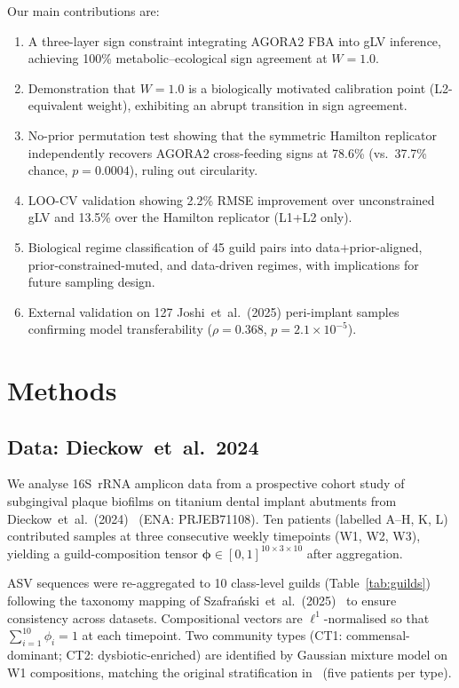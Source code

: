\documentclass[11pt,a4paper]{article}
\newcommand{\bphi}{\boldsymbol{\phi}}
\begin{document}
Our main contributions are:
\begin{enumerate}[noitemsep]
  \item A three-layer sign constraint integrating AGORA2 FBA into gLV inference,
        achieving 100\% metabolic--ecological sign agreement at $W{=}1.0$.
  \item Demonstration that $W{=}1.0$ is a biologically motivated calibration
        point (L2-equivalent weight), exhibiting an abrupt transition in sign
        agreement.
  \item No-prior permutation test showing that the symmetric Hamilton replicator
        independently recovers AGORA2 cross-feeding signs at 78.6\%
        (vs.\ 37.7\% chance, $p{=}0.0004$), ruling out circularity.
  \item LOO-CV validation showing 2.2\% RMSE improvement over unconstrained
        gLV and 13.5\% over the Hamilton replicator (L1+L2 only).
  \item Biological regime classification of 45 guild pairs into
        data$+$prior-aligned, prior-constrained-muted, and data-driven
        regimes, with implications for future sampling design.
  \item External validation on 127 Joshi~et~al.\ (2025) peri-implant samples
        confirming model transferability ($\rho{=}0.368$, $p{=}2.1{\times}10^{-5}$).
\end{enumerate}

\section{Methods}
\label{sec:methods}

\subsection{Data: Dieckow~et~al.\ 2024}
\label{ssec:data}

We analyse 16S~rRNA amplicon data from a prospective cohort study of
subgingival plaque biofilms on titanium dental implant abutments from
Dieckow~et~al.\ (2024)~\citep{dieckow2024} (ENA: PRJEB71108).
Ten patients (labelled A--H, K, L) contributed samples at three consecutive
weekly timepoints (W1, W2, W3), yielding a guild-composition tensor
$\bphi \in [0,1]^{10 \times 3 \times 10}$ after aggregation.

ASV sequences were re-aggregated to 10 class-level guilds (Table~\ref{tab:guilds})
following the taxonomy mapping of Szafra\'{n}ski~et~al.~(2025)~\citep{szafranski2025}
to ensure consistency across datasets.
Compositional vectors are $\ell^1$-normalised so that $\sum_{i=1}^{10}\phi_i=1$
at each timepoint.
Two community types (CT1: commensal-dominant; CT2: dysbiotic-enriched) are
identified by Gaussian mixture model on W1 compositions, matching the
original stratification in~\citet{dieckow2024} (five patients per type).
\end{document}
